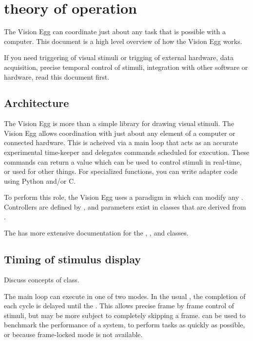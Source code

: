 \chapter{theory of operation \label{theory}}

The Vision Egg can coordinate just about any task that is possible
with a computer.  This document is a high level overview of how the
Vision Egg works.

If you need triggering of visual stimuli or trigging of external
hardware, data acquisition, precise temporal control of stimuli,
integration with other software or hardware, read this document first.

\section{Architecture}

The Vision Egg is more than a simple library for drawing visual
stimuli. The Vision Egg allows coordination with just about any
element of a computer or connected hardware.  This is acheived via a
main loop that acts as an accurate experimental time-keeper and
delegates commands scheduled for execution.  These commands can return
a value which can be used to control stimuli in real-time, or used for
other things. For specialized functions, you can write adapter code
using Python and/or C.

To perform this role, the Vision Egg uses a paradigm in which
 can modify any . Controllers are
defined by , and parameters exist in
classes that are derived from .

The  has more extensive documentation for the
, , and
 classes.

\section{Timing of stimulus display}

Discuss concepts of  class.

The main loop can execute in one of two modes.  In the usual
, the completion of each cycle is delayed
until the . This allows precise
frame by frame control of stimuli, but may be more subject to
completely skipping a frame.   can be used to
benchmark the performance of a system, to perform tasks as quickly as
possible, or because frame-locked mode is not available.


